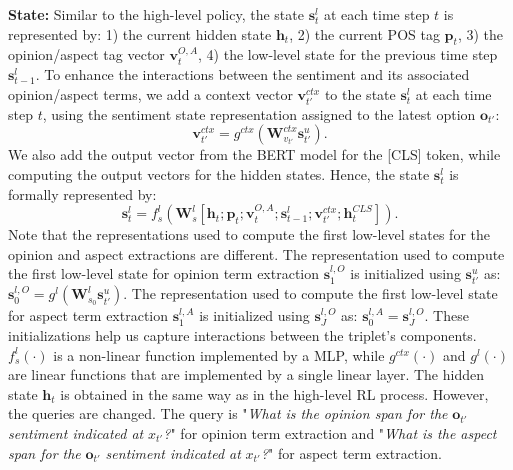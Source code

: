 \documentclass[sigconf]{acmart}
\begin{document}
\textbf{State:}
Similar to the high-level policy, the state $\mathrm{\textbf{s}}_t^l$ at each time step $t$ is represented by: 1) the current hidden state $\mathrm{\textbf{h}}_t$, 2) the current POS tag $\mathrm{\textbf{p}}_t$, 3) the opinion/aspect tag vector $\mathrm{\textbf{v}}_t^{O,A}$, 4) the low-level state for the previous time step $\mathrm{\textbf{s}}_{t-1}^l$. To enhance the interactions between the sentiment and its associated opinion/aspect terms, we add a context vector $\mathrm{\textbf{v}}_{t'}^{ctx}$ to the state $\mathrm{\textbf{s}}_t^l$ at each time step $t$, using the sentiment state representation assigned to the latest option $\mathrm{\textbf{o}}_{t'}$:
\begin{equation}
\mathrm{\textbf{v}}_{t'}^{ctx} = g^{ctx}(\mathrm{\textbf{W}}^{ctx}_{v_{t'}}\mathrm{\textbf{s}}_{t'}^{u}).
\end{equation}
We also add the output vector from the BERT model for the [CLS] token, while computing the output vectors for the hidden states. Hence, the state $\mathrm{\textbf{s}}_t^l$ is formally represented by:
\begin{equation}
\mathrm{\textbf{s}}_t^l = f^{l}_{s}(\mathrm{\textbf{W}}_s^l[\mathrm{\textbf{h}}_t;\mathrm{\textbf{p}}_t;\mathrm{\textbf{v}}_t^{O,A}; \mathrm{\textbf{s}}_{t-1}^{l}; \mathrm{\textbf{v}}_{t'}^{ctx};\mathrm{\textbf{h}}_t^{CLS}]).
\end{equation}
Note that the representations used to compute the first low-level states for the opinion and aspect extractions are different. The representation used to compute the first low-level state for opinion term extraction $\mathrm{\textbf{s}}_1^{l,O}$ is initialized using $\mathrm{\textbf{s}}^u_{t'}$ as: $\mathrm{\textbf{s}}_{0}^{l,O} = g^l(\mathrm{\textbf{W}}^{l}_{s_{0}}\mathrm{\textbf{s}}_{t'}^u
)$.
The representation used to compute the first low-level state for aspect term extraction $\mathrm{\textbf{s}}_1^{l,A}$ is initialized using $\mathrm{\textbf{s}}_J^{l,O}$ as: $\mathrm{\textbf{s}}_{0}^{l,A} = \mathrm{\textbf{s}}_J^{l,O}$.
These initializations help us capture interactions between the triplet's components.
$f^{l}_{s}(\cdot)$ is a non-linear function implemented by a MLP, while $g^{ctx}(\cdot)$ and $g^{l}(\cdot)$ are linear functions that are implemented by a single linear layer. The hidden state $\mathrm{\textbf{h}}_t$ is obtained in the same way as in the high-level RL process. However, the queries are changed. The query is "\emph{What is the opinion span for the} $\mathrm{\textbf{o}}_{t'}$ \emph{sentiment indicated at} $x_{t'}$\emph{?}" for opinion term extraction and "\emph{What is the aspect span for the} $\mathrm{\textbf{o}}_{t'}$ \emph{sentiment indicated at} $x_{t'}$\emph{?}" for aspect term extraction.
\end{document}
